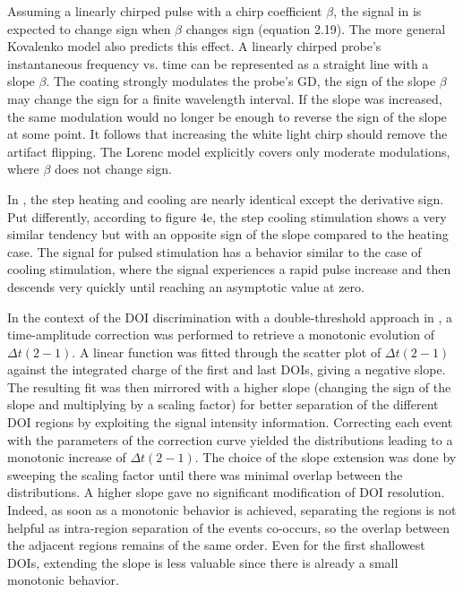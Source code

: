 \documentclass[11pt]{book}
\begin{document}
Assuming a linearly chirped pulse with a chirp coefficient $\beta$,
the signal in \cite{baudisch2018time} is expected to change sign
when $\beta$ changes sign (equation 2.19). The more general Kovalenko
model also predicts this effect. A linearly chirped probe's instantaneous
frequency vs. time can be represented as a straight line with a slope
$\beta$. The coating strongly modulates the probe's GD, the sign
of the slope $\beta$ may change the sign for a finite wavelength
interval. If the slope was increased, the same modulation would no
longer be enough to reverse the sign of the slope at some point. It
follows that increasing the white light chirp should remove the artifact
flipping. The Lorenc model explicitly covers only moderate modulations,
where $\beta$ does not change sign.

In \cite{venegas2018development}, the step heating and cooling are
nearly identical except the derivative sign. Put differently, according
to figure 4e, the step cooling stimulation shows a very similar tendency
but with an opposite sign of the slope compared to the heating case.
The signal for pulsed stimulation has a behavior similar to the case
of cooling stimulation, where the signal experiences a rapid pulse
increase and then descends very quickly until reaching an asymptotic
value at zero.

In the context of the DOI discrimination with a double-threshold approach
in \cite{polyachenko2020lynden}, a time-amplitude correction was
performed to retrieve a monotonic evolution of $\Delta t\left(2-1\right)$.
A linear function was fitted through the scatter plot of $\Delta t\left(2-1\right)$
against the integrated charge of the first and last DOIs, giving a
negative slope. The resulting fit was then mirrored with a higher
slope (changing the sign of the slope and multiplying by a scaling
factor) for better separation of the different DOI regions by exploiting
the signal intensity information. Correcting each event with the parameters
of the correction curve yielded the distributions leading to a monotonic
increase of $\Delta t\left(2-1\right)$. The choice of the slope extension
was done by sweeping the scaling factor until there was minimal overlap
between the distributions. A higher slope gave no significant modification
of DOI resolution. Indeed, as soon as a monotonic behavior is achieved,
separating the regions is not helpful as intra-region separation of
the events co-occurs, so the overlap between the adjacent regions
remains of the same order. Even for the first shallowest DOIs, extending
the slope is less valuable since there is already a small monotonic
behavior.
\end{document}
